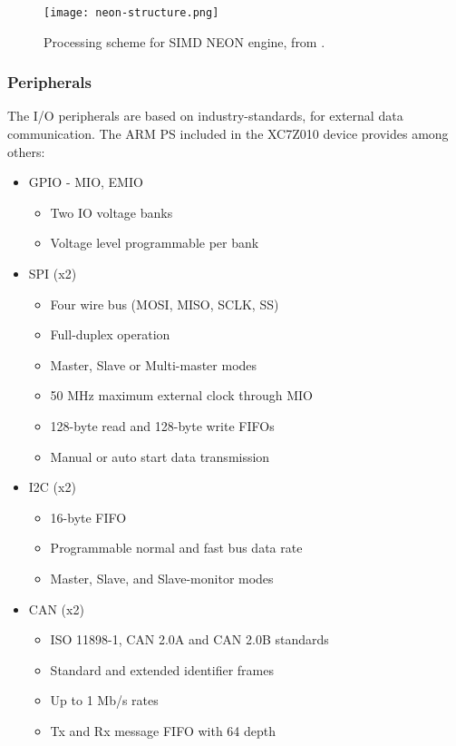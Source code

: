\begin{figure}[htp]
	\centering
	\texttt{[image: neon-structure.png]}
	\caption{Processing scheme for SIMD NEON engine, from \cite{Crokett2014}.} \label{fig:neon-structure}
\end{figure}

\subsubsection{Peripherals}

The I/O peripherals are based on industry-standards, for external data communication. The ARM PS included in the XC7Z010 device provides among others:

\begin{itemize}
	\item GPIO - MIO, EMIO
	\begin{itemize}
		\item Two IO voltage banks
		\item Voltage level programmable per bank
	\end{itemize}
	\item SPI (x2)
	\begin{itemize}
		\item Four wire bus (MOSI, MISO, SCLK, SS)
		\item Full-duplex operation
		\item Master, Slave or Multi-master modes
		\item 50 MHz maximum external clock through MIO
		\item 128-byte read and 128-byte write FIFOs
		\item Manual or auto start data transmission
	\end{itemize}
	\item I2C (x2)
	\begin{itemize}
		\item 16-byte FIFO
		\item Programmable normal and fast bus data rate
		\item Master, Slave, and Slave-monitor modes
	\end{itemize}
	\item CAN (x2)
	\begin{itemize}
		\item ISO 11898-1, CAN 2.0A and CAN 2.0B standards
		\item Standard and extended identifier frames
		\item Up to 1 Mb/s rates
		\item Tx and Rx message FIFO with 64 depth

\end{itemize}
\end{itemize}
